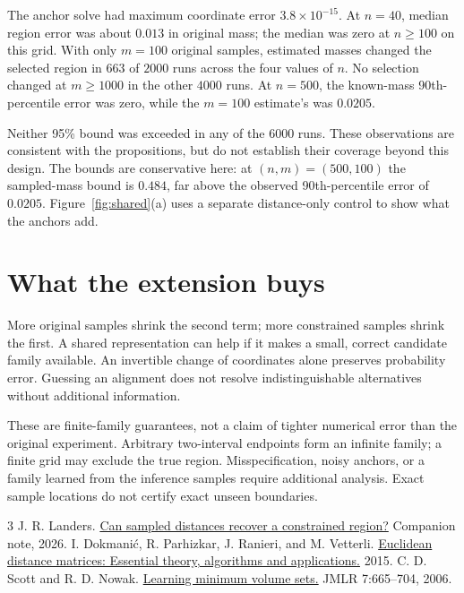 \documentclass[10pt,letterpaper]{article}
\theoremstyle{typed}
\begin{document}
The anchor solve had maximum coordinate error $3.8\times10^{-15}$.
At $n=40$, median region error was about $0.013$ in original mass;
the median was zero at $n\geq100$ on this grid. With only $m=100$
original samples, estimated masses changed the selected region in
$663$ of $2000$ runs across the four values of $n$. No selection changed
at $m\geq1000$ in the other $4000$ runs. At $n=500$, the known-mass
90th-percentile error was zero, while the $m=100$ estimate's was
$0.0205$.

Neither 95\% bound was exceeded in any of the $6000$ runs. These
observations are consistent with the propositions, but do not establish
their coverage beyond this design. The bounds are conservative here:
at $(n,m)=(500,100)$ the sampled-mass bound is $0.484$, far above the
observed 90th-percentile error of $0.0205$. Figure~\ref{fig:shared}(a)
uses a separate distance-only control to show what the anchors add.

\section{What the extension buys}

More original samples shrink the second term; more constrained samples
shrink the first. A shared representation can help if it makes a small,
correct candidate family available. An invertible change of coordinates
alone preserves probability error. Guessing an alignment does not
resolve indistinguishable alternatives without additional information.

These are finite-family guarantees, not a claim of tighter numerical
error than the original experiment. Arbitrary two-interval endpoints
form an infinite family; a finite grid may exclude the true region.
Misspecification, noisy anchors, or a family learned from the inference
samples require additional analysis. Exact sample locations do not
certify exact unseen boundaries.

{\footnotesize\raggedright
\begin{thebibliography}{3}
\setlength{\itemsep}{0pt}
 J. R. Landers.
\href{inverse_sampling_region.pdf}{Can sampled distances recover a constrained region?}
Companion note, 2026.
 I. Dokmani\'{c}, R. Parhizkar, J. Ranieri, and M. Vetterli.
\href{https://arxiv.org/abs/1502.07541}{Euclidean distance matrices: Essential theory, algorithms and applications.}
2015.
 C. D. Scott and R. D. Nowak.
\href{https://jmlr.org/papers/v7/scott06a.html}{Learning minimum volume sets.}
JMLR 7:665--704, 2006.
\end{thebibliography}}
\end{document}
